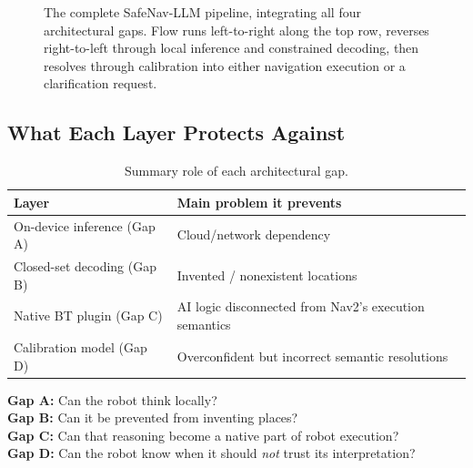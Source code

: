 \documentclass[11pt,a4paper]{article}
\newcommand{\gapbox}[2]{%
  \begin{tcolorbox}[colback=softblue,colframe=navyblue,title={#1},fonttitle=\bfseries,breakable]
  #2
  \end{tcolorbox}%
}
\begin{document}
\begin{figure}[h!]
{}
\caption{The complete SafeNav-LLM pipeline, integrating all four architectural gaps. Flow runs left-to-right along the top row, reverses right-to-left through local inference and constrained decoding, then resolves through calibration into either navigation execution or a clarification request.}
\end{figure}

\subsection{What Each Layer Protects Against}

\begin{table}[h]
\centering
\begin{tabular}{@{}p{3.4cm}p{9.4cm}@{}}
\toprule
\textbf{Layer} & \textbf{Main problem it prevents} \\
\midrule
On-device inference (Gap A) & Cloud/network dependency \\
Closed-set decoding (Gap B) & Invented / nonexistent locations \\
Native BT plugin (Gap C) & AI logic disconnected from Nav2's execution semantics \\
Calibration model (Gap D) & Overconfident but incorrect semantic resolutions \\
\bottomrule
\end{tabular}
\caption{Summary role of each architectural gap.}
\end{table}

\gapbox{The four questions}{
\textbf{Gap A:} Can the robot think locally?\\
\textbf{Gap B:} Can it be prevented from inventing places?\\
\textbf{Gap C:} Can that reasoning become a native part of robot execution?\\
\textbf{Gap D:} Can the robot know when it should \emph{not} trust its interpretation?
}
\end{document}
